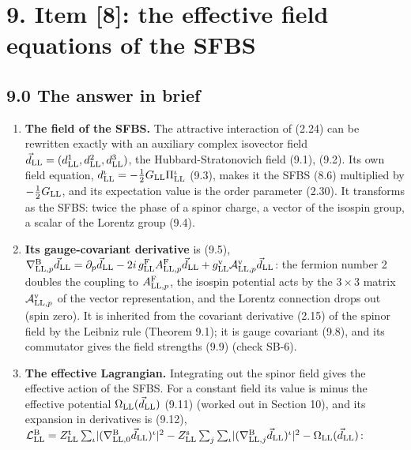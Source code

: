 \documentclass[
  10pt,
]{article}
\providecommand{\tightlist}{%
  \setlength{\itemsep}{0pt}\setlength{\parskip}{0pt}}
\begin{document}
\hypertarget{item-8-the-effective-field-equations-of-the-sfbs}{%
\section{9. Item {[}8{]}: the effective field equations of the
SFBS}\label{item-8-the-effective-field-equations-of-the-sfbs}}

\hypertarget{the-answer-in-brief-7}{%
\subsection{9.0 The answer in brief}\label{the-answer-in-brief-7}}

\begin{enumerate}
\def\labelenumi{\arabic{enumi}.}
\tightlist
\item
  \textbf{The field of the SFBS.} The attractive interaction of (2.24)
  can be rewritten exactly with an auxiliary complex isovector field
  \(\vec d_{\rm LL}=(d^1_{\rm LL},d^2_{\rm LL},d^3_{\rm LL})\), the
  Hubbard-Stratonovich field (9.1), (9.2). Its own field equation,
  \(d^\iota_{\rm LL}=-\tfrac12G_{\rm LL}\Pi^\iota_{\rm LL}\) (9.3),
  makes it the SFBS (8.6) multiplied by \(-\tfrac12G_{\rm LL}\), and its
  expectation value is the order parameter (2.30). It transforms as the
  SFBS: twice the phase of a spinor charge, a vector of the isospin
  group, a scalar of the Lorentz group (9.4).
\item
  \textbf{Its gauge-covariant derivative} is (9.5),
  \(\nabla^{\rm B}_{{\rm LL},p}\vec d_{\rm LL}=\partial_p\vec d_{\rm LL}-2i\,g^{\rm F}_{\rm LL}A^{\rm F}_{{\rm LL},p}\vec d_{\rm LL}+g^{\rm v}_{\rm LL}\mathcal A^{\rm v}_{{\rm LL},p}\vec d_{\rm LL}\):
  the fermion number 2 doubles the coupling to
  \(A^{\rm F}_{{\rm LL},p}\), the isospin potential acts by the
  \(3\times3\) matrix \(\mathcal A^{\rm v}_{{\rm LL},p}\) of the vector
  representation, and the Lorentz connection drops out (spin zero). It
  is inherited from the covariant derivative (2.15) of the spinor field
  by the Leibniz rule (Theorem 9.1); it is gauge covariant (9.8), and
  its commutator gives the field strengths (9.9) (check SB-6).
\item
  \textbf{The effective Lagrangian.} Integrating out the spinor field
  gives the effective action of the SFBS. For a constant field its value
  is minus the effective potential \(\Omega_{\rm LL}(\vec d_{\rm LL})\)
  (9.11) (worked out in Section 10), and its expansion in derivatives is
  (9.12),
  \(\mathcal L^{\rm B}_{\rm LL}=Z^{\rm t}_{\rm LL}\sum_\iota\lvert(\nabla^{\rm B}_{{\rm LL},0}\vec d_{\rm LL})^\iota\rvert^2-Z^{\rm s}_{\rm LL}\sum_j\sum_\iota\lvert(\nabla^{\rm B}_{{\rm LL},j}\vec d_{\rm LL})^\iota\rvert^2-\Omega_{\rm LL}(\vec d_{\rm LL})\):

\end{enumerate}
\end{document}
